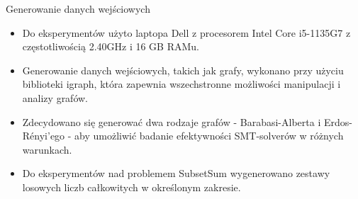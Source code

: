\begin{frame}{Generowanie danych wejściowych}
	\begin{itemize}
		\item Do eksperymentów użyto laptopa Dell z procesorem Intel Core i5-1135G7 z częstotliwością 2.40GHz i 16 GB RAMu.
		\item Generowanie danych wejściowych, takich jak grafy, wykonano przy użyciu biblioteki igraph, która zapewnia wszechstronne możliwości manipulacji i analizy grafów.
		
		\item Zdecydowano się generować dwa rodzaje grafów - Barabasi-Alberta i Erdos-Rényi’ego - aby umożliwić badanie efektywności SMT-solverów w różnych warunkach.
		
		\item Do eksperymentów nad problemem SubsetSum wygenerowano zestawy losowych liczb całkowitych w określonym zakresie.
		
	\end{itemize}
\end{frame}
	